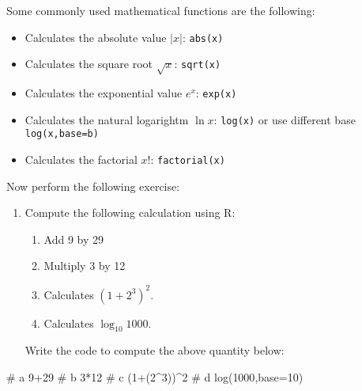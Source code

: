 \documentclass[
  letterpaper,
  DIV=11,
  numbers=noendperiod]{scrartcl}
\newenvironment{Shaded}{\begin{snugshade}}{\end{snugshade}}
\newcommand{\AttributeTok}[1]{\textcolor[rgb]{0.40,0.45,0.13}{#1}}
\newcommand{\CommentTok}[1]{\textcolor[rgb]{0.37,0.37,0.37}{#1}}
\newcommand{\DecValTok}[1]{\textcolor[rgb]{0.68,0.00,0.00}{#1}}
\newcommand{\FunctionTok}[1]{\textcolor[rgb]{0.28,0.35,0.67}{#1}}
\newcommand{\NormalTok}[1]{\textcolor[rgb]{0.00,0.23,0.31}{#1}}
\newcommand{\SpecialCharTok}[1]{\textcolor[rgb]{0.37,0.37,0.37}{#1}}
\providecommand{\tightlist}{%
  \setlength{\itemsep}{0pt}\setlength{\parskip}{0pt}}\usepackage{longtable,booktabs,array}
\begin{document}
Some commonly used mathematical functions are the following:

\begin{itemize}
\tightlist
\item
  Calculates the absolute value \(|x|\): \texttt{abs(x)}
\item
  Calculates the square root \(\sqrt{x}\): \texttt{sqrt(x)}
\item
  Calculates the exponential value \(e^x\): \texttt{exp(x)}
\item
  Calculates the natural logarightm \(\ln{x}\): \texttt{log(x)} or use
  different base \texttt{log(x,base=b)}
\item
  Calculates the factorial \(x!\): \texttt{factorial(x)}
\end{itemize}

Now perform the following exercise:

\begin{enumerate}
\def\labelenumi{\arabic{enumi}.}
\item
  Compute the following calculation using R:

  \begin{enumerate}
  \def\labelenumii{\alph{enumii}.}
  \tightlist
  \item
    Add 9 by 29
  \item
    Multiply 3 by 12
  \item
    Calculates \((1+2^3)^2\).
  \item
    Calculates \(\log_{10} 1000\).
  \end{enumerate}

  Write the code to compute the above quantity below:
\end{enumerate}

\begin{Shaded}
\begin{Highlighting}[]
\CommentTok{\# a}
\DecValTok{9}\SpecialCharTok{+}\DecValTok{29}
\CommentTok{\# b}
\DecValTok{3}\SpecialCharTok{*}\DecValTok{12}
\CommentTok{\# c}
\NormalTok{(}\DecValTok{1}\SpecialCharTok{+}\NormalTok{(}\DecValTok{2}\SpecialCharTok{\^{}}\DecValTok{3}\NormalTok{))}\SpecialCharTok{\^{}}\DecValTok{2}
\CommentTok{\# d}
\FunctionTok{log}\NormalTok{(}\DecValTok{1000}\NormalTok{,}\AttributeTok{base=}\DecValTok{10}\NormalTok{)}
\end{Highlighting}
\end{Shaded}
\end{document}

